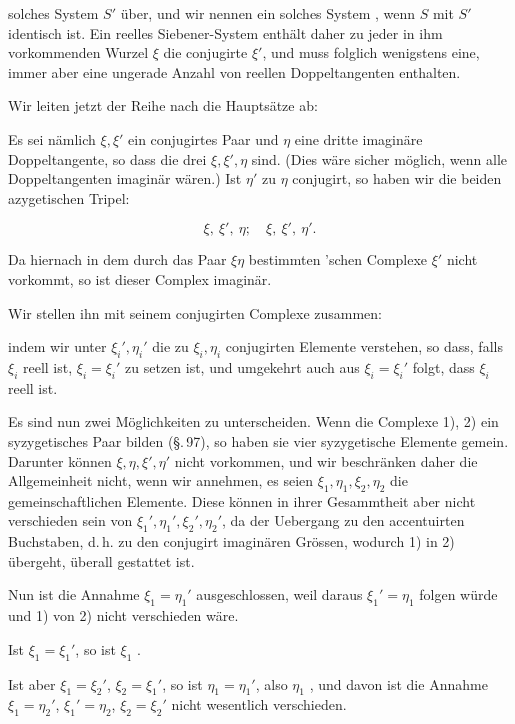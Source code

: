 
solches System $S'$ über, und wir nennen ein solches System
, wenn $S$ mit $S'$ identisch ist. Ein reelles Siebener-System
enthält daher zu jeder in ihm vorkommenden Wurzel $\xi$ die conjugirte
$\xi'$, und muss folglich wenigstens eine, immer aber eine
ungerade Anzahl von reellen Doppeltangenten enthalten.

Wir leiten jetzt der Reihe nach die Hauptsätze ab:


Es sei nämlich $\xi, \xi'$ ein conjugirtes Paar und $\eta$ eine dritte
imaginäre Doppeltangente, so dass die drei $\xi, \xi', \eta$ 
sind. (Dies wäre sicher möglich, wenn alle Doppeltangenten
imaginär wären.) Ist $\eta'$ zu $\eta$ conjugirt, so haben wir die beiden
azygetischen Tripel:

\[
\xi,\ \xi',\ \eta;\quad \xi,\ \xi',\ \eta'.
\]

Da hiernach in dem durch das Paar $\xi\eta$ bestimmten 'schen
Complexe $\xi'$ nicht vorkommt, so ist dieser Complex
imaginär.

Wir stellen ihn mit seinem conjugirten Complexe zusammen:


indem wir unter $\xi_i', \eta_i'$ die zu $\xi_i, \eta_i$ conjugirten Elemente verstehen,
so dass, falls $\xi_i$ reell ist, $\xi_i = \xi_i'$ zu setzen ist, und umgekehrt
auch aus $\xi_i = \xi_i'$ folgt, dass $\xi_i$ reell ist.

Es sind nun zwei Möglichkeiten zu unterscheiden. Wenn
 die Complexe 1), 2) ein syzygetisches Paar bilden (\S.\,97),
so haben sie vier syzygetische Elemente gemein. Darunter
können $\xi, \eta, \xi', \eta'$ nicht vorkommen, und wir beschränken daher
die Allgemeinheit nicht, wenn wir annehmen, es seien $\xi_1, \eta_1, \xi_2, \eta_2$
die gemeinschaftlichen Elemente. Diese können in ihrer Gesammtheit
aber nicht verschieden sein von $\xi_1', \eta_1', \xi_2', \eta_2'$, da der
Uebergang zu den accentuirten Buchstaben, d.\,h. zu den conjugirt
imaginären Grössen, wodurch 1) in 2) übergeht, überall
gestattet ist.

Nun ist die Annahme $\xi_1 = \eta_1'$ ausgeschlossen, weil daraus
$\xi_1' = \eta_1$ folgen würde und 1) von 2) nicht verschieden wäre.

Ist $\xi_1 = \xi_1'$, so ist $\xi_1$ .

Ist aber $\xi_1 = \xi_2'$, $\xi_2 = \xi_1'$,
so ist $\eta_1 = \eta_1'$, also $\eta_1$ ,
und davon ist die Annahme $\xi_1 = \eta_2'$, $\xi_1' = \eta_2$, $\xi_2 = \xi_2'$ nicht
wesentlich verschieden.
